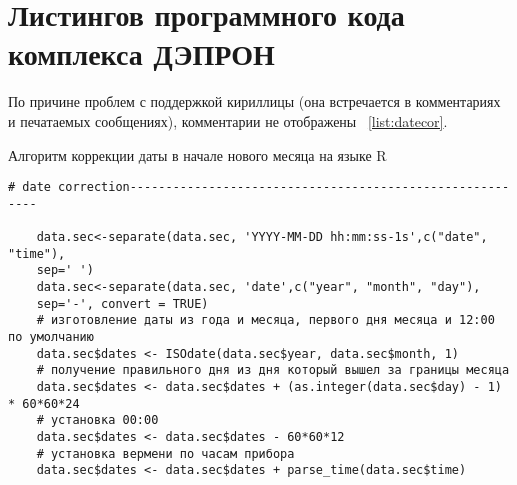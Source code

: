 %

\chapter{Листингов программного кода комплекса ДЭПРОН} \label{AppendixB}


По причине проблем с поддержкой кириллицы (она встречается в комментариях и
печатаемых сообщениях), комментарии не отображены ~\ref{list:datecor}.

\begin{ListingEnv}[H]
	\caption{Алгоритм коррекции даты в начале нового месяца на языке R}
	\label{list:datecor}
	\begin{lstlisting}[language={Renhanced}]
	# date correction---------------------------------------------------------
	
	data.sec<-separate(data.sec, 'YYYY-MM-DD hh:mm:ss-1s',c("date", "time"),
	sep=' ')
	data.sec<-separate(data.sec, 'date',c("year", "month", "day"),
	sep='-', convert = TRUE)
	# изготовление даты из года и месяца, первого дня месяца и 12:00 по умолчанию
	data.sec$dates <- ISOdate(data.sec$year, data.sec$month, 1)
	# получение правильного дня из дня который вышел за границы месяца
	data.sec$dates <- data.sec$dates + (as.integer(data.sec$day) - 1) * 60*60*24
	# установка 00:00  
	data.sec$dates <- data.sec$dates - 60*60*12 
	# установка вермени по часам прибора
	data.sec$dates <- data.sec$dates + parse_time(data.sec$time)
	
	\end{lstlisting}
\end{ListingEnv}


